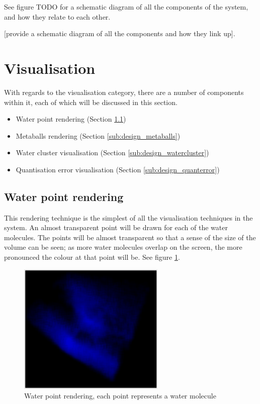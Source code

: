 See figure TODO for a schematic diagram of all the components of the system,
and how they relate to each other.

[provide a schematic diagram of all the components and how they link up].


\section{Visualisation}
\label{sec:design_visualisation}


With regards to the visualisation category, there are a number of components
within it, each of which will be discussed in this section.

\begin{itemize}
  \item Water point rendering (Section \ref{sub:design_waterpoint})
  \item Metaballs rendering (Section \ref{sub:design_metaballs})
  \item Water cluster visualisation (Section \ref{sub:design_watercluster})
  \item Quantisation error visualisation (Section \ref{sub:design_quanterror})
\end{itemize}


\subsection{Water point rendering}
\label{sub:design_waterpoint}

This rendering technique is the simplest of all the visualisation techniques in
the system. An almost transparent point will be drawn for each of the water
molecules. The points will be almost transparent so that a sense of the size of
the volume can be seen; as more water molecules overlap on the screen, the more
pronounced the colour at that point will be. See figure
\ref{fig:design_waterpoint}.

\begin{figure}[h!]
  \begin{center}
    \includegraphics[width=70mm]{waterpoint}
  \end{center}
  \caption{Water point rendering, each point represents a water molecule}
  \label{fig:design_waterpoint}
\end{figure}

